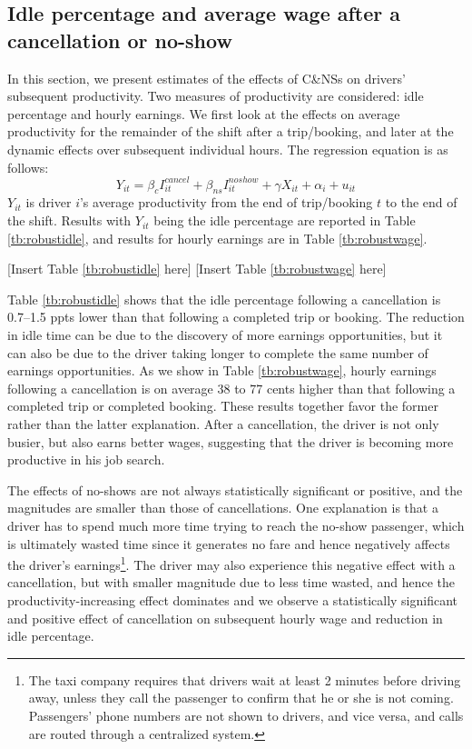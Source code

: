 \documentclass[reviewmode]{AEA}
\begin{document}
\subsection{Idle percentage and average wage after a cancellation or no-show}
In this section, we present estimates of the effects of C\&NSs on drivers' subsequent productivity. Two measures of productivity are considered: idle percentage and hourly earnings. We first look at the effects on average productivity for the remainder of the shift after a trip/booking, and later at the dynamic effects over subsequent individual hours. The regression equation is as follows:
\begin{equation}
\label{eq:outcomes}
Y_{it} = \beta_c I^{cancel}_{it} + \beta_{ns} I^{noshow}_{it}+ \gamma X_{it} + \alpha_i  + u_{it}
\end{equation}
$Y_{it}$ is driver $i$'s average productivity from the end of trip/booking $t$ to the end of the shift. Results with $Y_{it}$ being the idle percentage are reported in Table \ref{tb:robustidle}, and results for hourly earnings are in Table \ref{tb:robustwage}.

\begin{center}
	[Insert Table \ref{tb:robustidle} here]
	[Insert Table \ref{tb:robustwage} here]
\end{center}

Table \ref{tb:robustidle} shows that the idle percentage following a cancellation is 0.7--1.5 ppts lower than that following a completed trip or booking. The reduction in idle time can be due to the discovery of more earnings opportunities, but it can also be due to the driver taking longer to complete the same number of earnings opportunities. As we show in Table \ref{tb:robustwage}, hourly earnings following a cancellation is on average 38 to 77 cents higher than that following a completed trip or completed booking. These results together favor the former rather than the latter explanation. After a cancellation, the driver is not only busier, but also earns better wages, suggesting that the driver is becoming more productive in his job search. 

The effects of no-shows are not always statistically significant or positive, and the magnitudes are smaller than those of cancellations. One explanation is that a driver has to spend much more time trying to reach the no-show passenger, which is ultimately wasted time since it generates no fare and hence negatively affects the driver's earnings\footnote{The taxi company requires that drivers wait at least 2 minutes before driving away, unless they call the passenger to confirm that he or she is not coming. Passengers' phone numbers are not shown to drivers, and vice versa, and calls are routed through a centralized system.}. The driver may also experience this negative effect with a cancellation, but with smaller magnitude due to less time wasted, and hence the productivity-increasing effect dominates and we observe a statistically significant and positive effect of cancellation on subsequent hourly wage and reduction in idle percentage.
\end{document}

